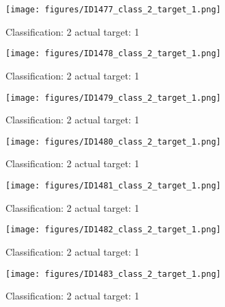 \begin{figure}[h!]
\begin{center}
\texttt{[image: figures/ID1477\_class\_2\_target\_1.png]}
\end{center}
\caption{ Classification: 2 actual target: 1}
\label{fig:ID1477_class_2_target_1}
\end{figure}
\begin{figure}[h!]
\begin{center}
\texttt{[image: figures/ID1478\_class\_2\_target\_1.png]}
\end{center}
\caption{ Classification: 2 actual target: 1}
\label{fig:ID1478_class_2_target_1}
\end{figure}
\begin{figure}[h!]
\begin{center}
\texttt{[image: figures/ID1479\_class\_2\_target\_1.png]}
\end{center}
\caption{ Classification: 2 actual target: 1}
\label{fig:ID1479_class_2_target_1}
\end{figure}
\begin{figure}[h!]
\begin{center}
\texttt{[image: figures/ID1480\_class\_2\_target\_1.png]}
\end{center}
\caption{ Classification: 2 actual target: 1}
\label{fig:ID1480_class_2_target_1}
\end{figure}
\begin{figure}[h!]
\begin{center}
\texttt{[image: figures/ID1481\_class\_2\_target\_1.png]}
\end{center}
\caption{ Classification: 2 actual target: 1}
\label{fig:ID1481_class_2_target_1}
\end{figure}
\begin{figure}[h!]
\begin{center}
\texttt{[image: figures/ID1482\_class\_2\_target\_1.png]}
\end{center}
\caption{ Classification: 2 actual target: 1}
\label{fig:ID1482_class_2_target_1}
\end{figure}
\begin{figure}[h!]
\begin{center}
\texttt{[image: figures/ID1483\_class\_2\_target\_1.png]}
\end{center}
\caption{ Classification: 2 actual target: 1}
\label{fig:ID1483_class_2_target_1}
\end{figure}
